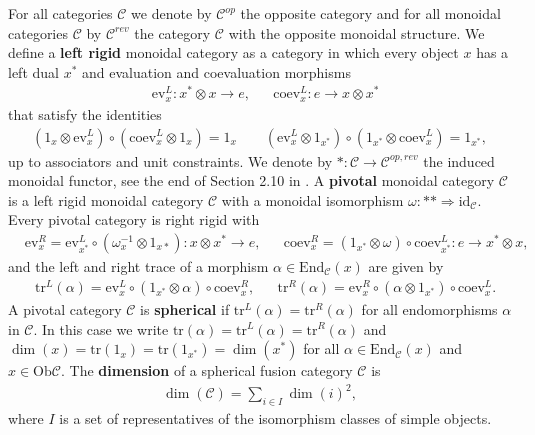 \documentclass[1.5pt, a4paper]{article}
\newcommand{\mac}{\mathcal C}
\newcommand{\End}{\mathrm{End}}
\newcommand{\Ob}{\mathrm{Ob}}
\newcommand{\ev}{\mathrm{ev}}
\newcommand{\coev}{\mathrm{coev}}
\newcommand{\inv}[0]{{-1}}
\newcommand{\oo}[0]{\otimes}
\newcommand{\id}[0]{\mathrm{id}}
\newcommand{\tr}[0]{\mathrm{tr}}
\begin{document}
For all categories $\mac$ we denote by $\mac^{op}$ the opposite category and for all monoidal categories $\mac$ by $\mac^{rev}$ the category $\mac$ with the opposite monoidal structure. We define a {\bf left rigid} monoidal category as a category in which every object $x$ has a left dual $x^*$  and evaluation and coevaluation morphisms
\begin{align}\label{eq:coevl}
&\ev^L_x: x^*\oo x\to e, & &\coev^L_x: e\to x\oo x^*
\end{align}
that satisfy the identities 
\begin{align}\label{eq:snake}
(1_x\oo\ev^L_x)\circ (\coev^L_x\oo 1_x)=1_x\qquad (\ev^L_x\oo 1_{x^*})\circ (1_{x^*}\oo \coev^L_x)=1_{x^*},
\end{align}
 up to associators and unit constraints. 
We denote by $*: \mac\to\mac^{op,rev}$ the induced monoidal functor, see the  end of Section 2.10 in \cite{EGNO}. 
A {\bf pivotal} monoidal category $\mac$ is a left rigid monoidal category $\mac$ with a monoidal isomorphism  $\omega:**\Rightarrow\id_\mac$. 
Every pivotal category is right rigid with  
\begin{align}\label{eq:coevr}
&\ev^R_x=\ev^L_{x^*}\circ (\omega^\inv_x\oo 1_{x*}): x\oo x^*\to e, & &\coev^R_x=(1_{x^*}\oo\omega)\circ \coev^L_{x^*}: e\to x^*\oo x,
\end{align}
and the left and right trace of a morphism $\alpha\in \End_\mac(x)$ are given by
\begin{align}
&\tr^L(\alpha)=\ev^L_x\circ (1_{x^*}\oo \alpha)\circ \coev^R_x, & &\tr^R(\alpha)=\ev^R_x\circ (\alpha\oo 1_{x^*})\circ \coev^L_x.
\end{align}
A pivotal category $\mac$ is {\bf spherical} if $\tr^L(\alpha)=\tr^R(\alpha)$ for all endomorphisms $\alpha$ in $\mac$. In this case we  write $\tr(\alpha)=\tr^L(\alpha)=\tr^R(\alpha)$ and $\dim(x)=\tr(1_x)=\tr(1_{x^*})=\dim(x^*)$ for all $\alpha\in \End_\mac(x)$ and $x\in\Ob\mac$. 
The {\bf dimension} of a spherical fusion category $\mac$ is 
\begin{align}
\label{eq:catdimension}
\dim(\mac)=\sum_{i\in I} \dim(i)^2,
\end{align}
where $I$ is a set of representatives of the isomorphism classes of simple objects. 
\end{document}
